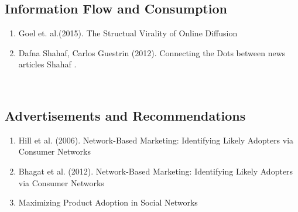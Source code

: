 \subsection{Information Flow and Consumption}  
\begin{enumerate}  

\item  Goel et.  al.(2015).  The Structual Virality of Online Diffusion\cite{Goel_2015}  
\item  Dafna Shahaf, Carlos Guestrin (2012). Connecting the Dots between news articles Shahaf  . \cite{Shahaf:2012:CTD:2086737.2086744} \end{enumerate}  
\\  
\subsection{Advertisements and Recommendations}  
\begin{enumerate}  
\item Hill et al. (2006).  Network-Based Marketing: Identifying Likely Adopters via Consumer Networks\cite{Hill_2006}  
\item  Bhagat et al. (2012). Network-Based Marketing: Identifying Likely Adopters via Consumer Networks  
\item   Maximizing Product Adoption in Social Networks\cite{Bhagat:2012:MPA:2124295.2124368} 
\end{enumerate} 